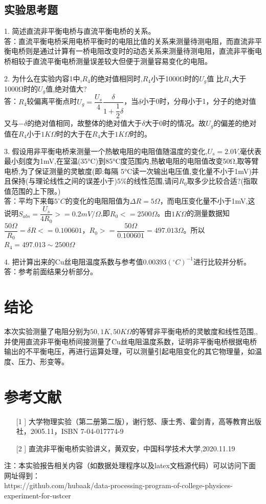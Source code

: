 \documentclass[UEF8]{ctexart}
\begin{document}
\begin{multicols}{2}
\subsection{实验思考题}
1. 简述直流非平衡电桥与直流平衡电桥的关系。\\
答：直流平衡电桥采用电桥平衡时的电阻比值的关系来测量待测电阻，而直流非平衡电桥则是通过计算有一桥电阻改变时的动态关系来测量待测电阻，直流非平衡电桥相较于直流平衡电桥测量误差较大但便于测量容易变化的电阻。

2. 为什么在实验内容1中,$R_{4}$的绝对值相同时,$R_{4}$小于1000Ω时的$U_{g}$值
比$R_{4}$大于1000Ω时的$U_{g}$值,绝对值大? \\
答：$R_{4}$较偏离平衡点时$U_{g}=\dfrac{U_{s}}{4}\dfrac{\delta}{1+\dfrac{1}{2}\delta}$，当$\delta$小于0时，分母小于1，分子的绝对值又与$-\delta$的绝对值相同，故整体的绝对值大于$\delta$大于0时的情况。故$U_{g}$的偏差的绝对值在$R_{4}$小于$1K\Omega$时的大于在$R_{4}$大于$1K\Omega$时的。

3. 假设用非平衡电桥来测量一个热敏电阻的电阻值随温度的变化,$U_{s}=2.0V$,毫伏表最小刻度为1mV,在室温(35°C)到85°C度范围内,热敏电阻的电阻值改变50Ω,取等臂电桥,为了保证测量的灵敏度(即:每隔 5°C读一次输出电压值,变化量不小于1mV)并且保持(与理论线性之间的误差小于)5\%的线性范围,请问$R_{0}$取多少比较合适?(指取值范围的上下限。) \\
答：平均下来每$5^\circ{C}$的变化的电阻阻值为$\Delta{R}=5\Omega$，而电压变化量不小于1mV,这说明$S_{abs}=\dfrac{U_{s}}{4R_{0}}>=0.2mV/\Omega$,即$R_{0}<=2500\Omega$。由$1K\Omega$的测量数据知$\dfrac{50\Omega}{R_{0}}=\delta{R}<=0.100601$，$R_{0}>=\dfrac{50\Omega}{0.100601}=497.013\Omega$。所以$R_{4}=497.013\sim 2500\Omega$

4. 把计算出来的Cu丝电阻温度系数与参考值$0.00393(^\circ{C})^{-1}$进行比较并分析。 \\
答：参考前面结果分析部分。

\section{结论}
本次实验测量了电阻分别为$50,1K,50K\Omega$的等臂非平衡电桥的灵敏度和线性范围,,并使用直流非平衡电桥间接测量了Cu丝电阻温度系数，证明非平衡电桥根据电桥输出的不平衡电压，再进行运算处理，可以测量引起电阻变化的其它物理量，如温度、压力、形变等。

\section{参考文献}
\begin{enumerate}
	\item[[1]] 大学物理实验（第二册第二版），谢行怒、康士秀、霍剑青，高等教育出版社，2005.11，ISBN 7-04-017774-9
	\item[[2]] 直流非平衡电桥实验讲义，黄双安，中国科学技术大学,2020.11.19 
\end{enumerate}
\small
注：本实验报告相关内容（如数据处理程序以及latex文档源代码）可以访问下面网址得到：\\
https://github.com/hubaak/data-processing-program-of-college-physices-experiment-for-ustcer


\end{multicols}
\end{document}
